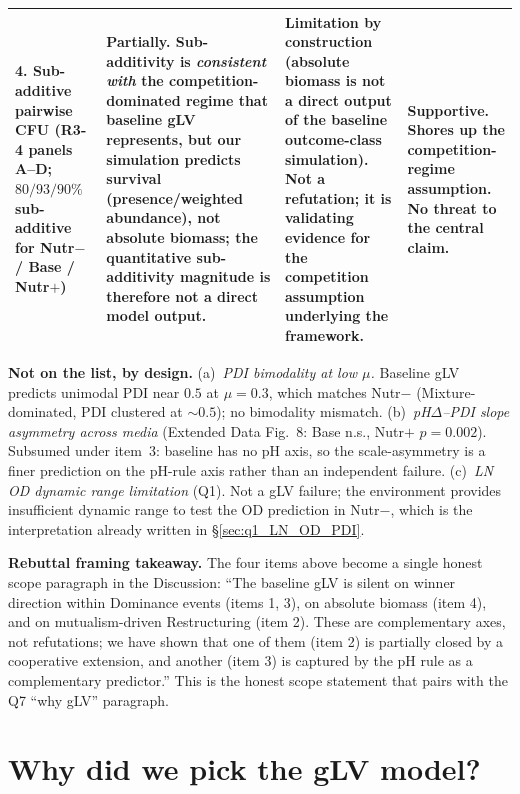 \documentclass[11pt]{article}
\begin{document}
\begin{center}
\begin{tabular}{p{} p{} p{} p{}}
\textbf{4. Sub-additive pairwise CFU} \newline (R3-4 panels A--D; $80/93/90\%$ sub-additive for Nutr$-$ / Base / Nutr$+$) &
Partially. Sub-additivity is \emph{consistent with} the competition-dominated regime that baseline gLV represents, but our simulation predicts survival (presence/weighted abundance), not absolute biomass; the quantitative sub-additivity magnitude is therefore not a direct model output. &
Limitation by construction (absolute biomass is not a direct output of the baseline outcome-class simulation). Not a refutation; it is validating evidence for the competition assumption underlying the framework. &
Supportive. Shores up the competition-regime assumption. No threat to the central claim. \\
\bottomrule
\end{tabular}
\end{center}

\noindent\textbf{Not on the list, by design.}
(a)~\emph{PDI bimodality at low $\mu$.} Baseline gLV predicts unimodal PDI near $0.5$ at $\mu = 0.3$, which matches Nutr$-$ (Mixture-dominated, PDI clustered at $\sim 0.5$); no bimodality mismatch.
(b)~\emph{pH$\Delta$--PDI slope asymmetry across media} (Extended Data Fig.~8: Base n.s., Nutr$+$ $p = 0.002$). Subsumed under item~3: baseline has no pH axis, so the scale-asymmetry is a finer prediction on the pH-rule axis rather than an independent failure.
(c)~\emph{LN OD dynamic range limitation} (Q1). Not a gLV failure; the environment provides insufficient dynamic range to test the OD prediction in Nutr$-$, which is the interpretation already written in \S\ref{sec:q1_LN_OD_PDI}.

\noindent\textbf{Rebuttal framing takeaway.} The four items above become a single honest scope paragraph in the Discussion: ``The baseline gLV is silent on winner direction within Dominance events (items 1, 3), on absolute biomass (item 4), and on mutualism-driven Restructuring (item 2). These are complementary axes, not refutations; we have shown that one of them (item 2) is partially closed by a cooperative extension, and another (item 3) is captured by the pH rule as a complementary predictor.'' This is the honest scope statement that pairs with the Q7 ``why gLV'' paragraph.

\section{Why did we pick the gLV model?}
\label{sec:q7_why_gLV}
\end{document}
